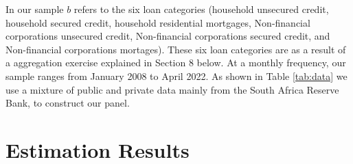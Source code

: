 \documentclass[
]{article}
\begin{document}
In our sample \(b\) refers to the six loan categories (household unsecured credit, household secured credit, household residential mortgages, Non-financial corporations unsecured credit, Non-financial corporations secured credit, and Non-financial corporations mortages). These six loan categories are as a result of a aggregation exercise explained in Section 8 below. At a monthly frequency, our sample ranges from January 2008 to April 2022. As shown in Table \ref{tab:data} we use a mixture of public and private data mainly from the South Africa Reserve Bank, to construct our panel.

\hypertarget{estimation-results}{%
\section{Estimation Results}\label{estimation-results}}

\providecommand{\docline}[3]{\noalign{\global\setlength{\arrayrulewidth}{#1}}\arrayrulecolor[HTML]{#2}\cline{#3}}

\setlength{\tabcolsep}{0pt}

\renewcommand*{\arraystretch}{1.2}
\end{document}
